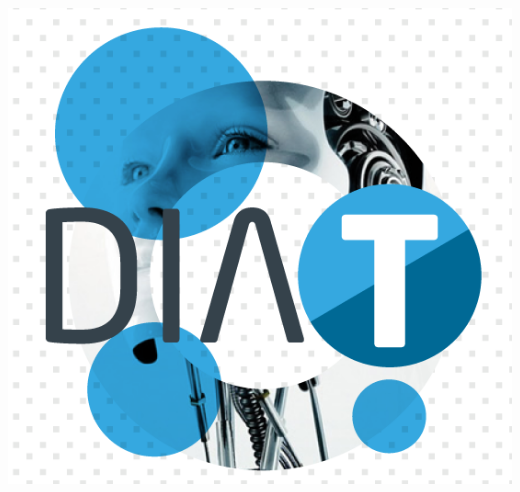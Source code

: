 \documentclass[portrait,a0]{a0poster}
\begin{document}
\begin{minipage}[b]{0.25\linewidth}
\includegraphics[scale=0.8]{DiaT-mod.png}\\
\end{minipage}

\vspace{1cm} %

\end{document}
